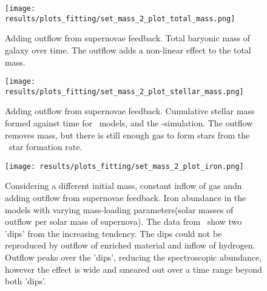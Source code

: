 \begin{figure}[h]
  \begin{minipage}[t][][t]{0.4\textwidth}
  \centering
  \texttt{[image: results/plots\_fitting/set\_mass\_2\_plot\_total\_mass.png]}
  \caption[Total mass of \fiduccialomega with outflow mass-fitting]{
    \label{fig:fit-v1-2-total}
    Adding outflow from supernovae feedback.
    Total baryonic mass of galaxy over time.
    The outflow adds a non-linear effect to the total mass.
  }
  \end{minipage}
  \hfill
  \begin{minipage}[t][][t]{0.4\textwidth}
  \centering
  \texttt{[image: results/plots\_fitting/set\_mass\_2\_plot\_stellar\_mass.png]}
  \caption[Stellar mass of \fiduccialomega for with outflow mass-fitting]{
    \label{fig:fit-v1-2-stellar}
    Adding outflow from supernovae feedback.
    Cumulative stellar mass formed against time for  \omegamodel\ models, and the \eris-simulation.
    The outflow removes mass, but there is still enough gas to form stars from the \eris\ star formation rate.
  }
  \end{minipage}
\end{figure}
\begin{figure}[h]
  \centering
  \texttt{[image: results/plots\_fitting/set\_mass\_2\_plot\_iron.png]}
  \caption[\[Fe/H\] of \fiduccialomega for with outflow mass-fitting]{
    \label{fig:fit-v1-2-iron}
    Considering a different initial mass, constant inflow of gas andn adding outflow from supernovae feedback.
    Iron abundance in the models with varying mass-loading parameters(solar masses of outflow per solar mass of supernova). The data from \eris\ show two 'dips' from the increasing tendency.
    The dips could not be reproduced by outflow of enriched material and inflow of hydrogen. Outflow peaks over the 'dips', reducing the spectroscopic abundance, however the effect is wide and smeared out over a time range beyond both 'dips'.
  }
\end{figure}
